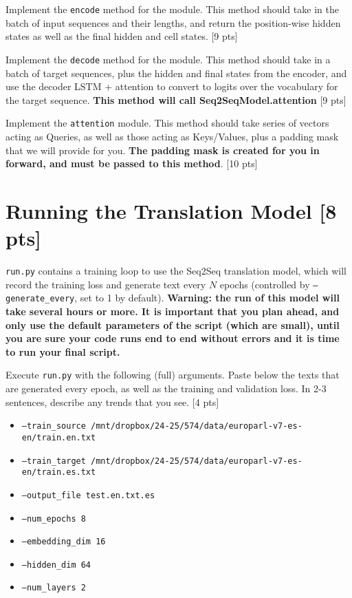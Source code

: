 \documentclass[11pt]{article}
\begin{document}
\vspace{2em}
 Implement the \texttt{encode} method for the module. This method should take in the batch of input sequences and their lengths, and return the position-wise hidden states as well as the final hidden and cell states. \hfill [9 pts]

\vspace{2em}
 Implement the \texttt{decode} method for the module. This method should take in a batch of target sequences, plus the hidden and final states from the encoder, and use the decoder LSTM + attention to convert to logits over the vocabulary for the target sequence. \textbf{This method will call Seq2SeqModel.attention} \hfill [9 pts]

\vspace{2em}
 Implement the \texttt{attention} module. This method should take series of vectors acting as Queries, as well as those acting as Keys/Values, plus a padding mask that we will provide for you. \textbf{The padding mask is created for you in forward, and must be passed to this method}. \hfill [10 pts]

\section{Running the Translation Model [8 pts]}

\texttt{run.py} contains a training loop to use the Seq2Seq translation model, which will record the training loss and generate text every $N$ epochs (controlled by \texttt{--generate\_every}, set to 1 by default). \textbf{Warning: the run of this model will take several hours or more. It is important that you plan ahead, and only use the default parameters of the script (which are small), until you are sure your code runs end to end without errors and it is time to run your final script.}

\vspace{2em}
  Execute \texttt{run.py} with the following (full) arguments. Paste below the texts that are generated every epoch, as well as the training and validation loss.  In 2-3 sentences, describe any trends that you see. \hfill [4 pts]
\begin{itemize}
    \item \texttt{--train\_source /mnt/dropbox/24-25/574/data/europarl-v7-es-en/train.en.txt}
    \item \texttt{--train\_target /mnt/dropbox/24-25/574/data/europarl-v7-es-en/train.es.txt}
    \item \texttt{--output\_file test.en.txt.es}
    \item \texttt{--num\_epochs 8}
    \item \texttt{--embedding\_dim 16}
    \item \texttt{--hidden\_dim 64}
    \item \texttt{--num\_layers 2}
\end{itemize}
\end{document}
